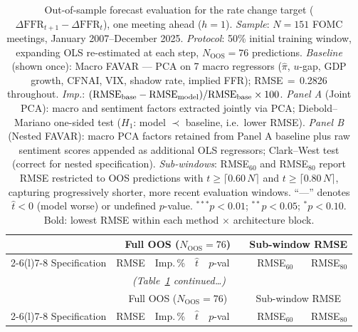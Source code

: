 %
%
%   

\begin{small}
\setlength{\LTcapwidth}{\textwidth}
\begin{longtable}{@{} l r r r r @{\hspace{3pt}} l @{\hspace{6pt}} r r @{}}

\caption{Out-of-sample forecast evaluation for the rate change target
($\Delta\mathrm{FFR}_{t+1} - \Delta\mathrm{FFR}_t$), one meeting ahead ($h=1$).
\textit{Sample}: $N=151$ FOMC meetings, January 2007--December 2025.
\textit{Protocol}: 50\% initial training window, expanding OLS re-estimated at each step,
$N_{\mathrm{OOS}}=76$ predictions.
\textit{Baseline} (shown once): Macro FAVAR --- PCA on 7 macro regressors
($\hat{\pi}$, $u$-gap, GDP growth, CFNAI, VIX, shadow rate, implied FFR);
RMSE\,$=$\,0.2826 throughout.
\textit{Imp.}: $({\rm RMSE}_{\rm base} - {\rm RMSE}_{\rm model})/{\rm RMSE}_{\rm base}\times 100$.
\textit{Panel A} (Joint PCA): macro and sentiment factors extracted jointly via PCA;
Diebold--Mariano one-sided test ($H_1$: model $\prec$ baseline, i.e.\ lower RMSE).
\textit{Panel B} (Nested FAVAR): macro PCA factors retained from Panel A baseline plus
raw sentiment scores appended as additional OLS regressors; Clark--West test (correct
for nested specification).
\textit{Sub-windows}: RMSE$_{60}$ and RMSE$_{80}$ report RMSE restricted to OOS
predictions with $t\geq\lceil 0.60\,N\rceil$ and $t\geq\lceil 0.80\,N\rceil$,
capturing progressively shorter, more recent evaluation windows.
``---'' denotes $\hat{t}<0$ (model worse) or undefined $p$-value.
$^{***}p<0.01$;\; $^{**}p<0.05$;\; $^{*}p<0.10$.
Bold: lowest RMSE within each method $\times$ architecture block.}
\label{tab:delta_unified}\\

\toprule
 & \multicolumn{5}{c}{Full OOS ($N_{\mathrm{OOS}}=76$)}
 & \multicolumn{2}{c}{Sub-window RMSE} \\
\cmidrule(lr){2-6}\cmidrule(l){7-8}
Specification
  & RMSE & Imp.\,\% & $\hat{t}$ & $p$-val &
  & RMSE$_{60}$ & RMSE$_{80}$ \\
\midrule
\endfirsthead

\multicolumn{8}{c}{\footnotesize\itshape (Table~\ref{tab:delta_unified} continued\ldots)}\\[4pt]
\toprule
 & \multicolumn{5}{c}{Full OOS ($N_{\mathrm{OOS}}=76$)}
 & \multicolumn{2}{c}{Sub-window RMSE} \\
\cmidrule(lr){2-6}\cmidrule(l){7-8}
Specification
  & RMSE & Imp.\,\% & $\hat{t}$ & $p$-val &
  & RMSE$_{60}$ & RMSE$_{80}$ \\
\midrule
\endhead


\end{longtable}
\end{small}
